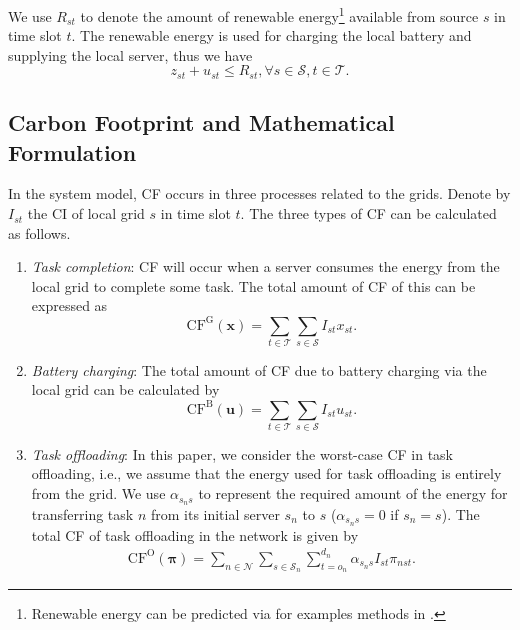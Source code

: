\documentclass[conference, 10pt, ﬁnal, letterpaper, twocolumn]{IEEEtran}
\begin{document}
We use $R_{st}$ to denote the amount of renewable energy\footnote{Renewable energy can be predicted via for examples methods in \cite{li2019renewable}.} available from source $s$ in time slot $t$. The renewable energy is used for charging the local battery and supplying the local server, thus we have  
\begin{equation}\label{c5}
    z_{st} + u_{st} \leq R_{st}, \forall s \in \mathcal{S}, t \in \mathcal{T}.
\end{equation}

\subsection{Carbon Footprint and Mathematical Formulation} \label{subsec:CFA}

In the system model, CF occurs in three processes related to the grids. Denote by $I_{st}$ the CI of local grid $s$ in time slot $t$. The three types of CF can be calculated as follows.
\begin{enumerate}
    \item {\em Task completion}: CF will occur when a server consumes the energy from the local grid to complete some task. The total amount of CF of this can be expressed as
    \begin{equation}\label{th}
        \text{CF}^{\text{G}}(\boldsymbol{x}) = \sum_{t \in \mathcal{T}} \sum_{s\in \mathcal{S}} I_{st}x_{st}.
    \end{equation}
    \item {\em Battery charging}: The total amount of CF due to battery charging via the local grid can be calculated by
    \begin{equation}\label{bc}
        \text{CF}^{\text{B}}(\boldsymbol{u}) = \sum_{t \in \mathcal{T}} \sum_{s\in \mathcal{S}} I_{st}u_{st}.
    \end{equation}
    \item {\em Task offloading}: In this paper, we consider the worst-case CF in task offloading, i.e., we assume that the energy used for task offloading is entirely from the grid. We use $\alpha_{s_n s}$ to represent the required amount of the energy for transferring task $n$ from its initial server $s_n$ to $s$ ($\alpha_{s_n s} = 0$ if $s_n = s$). The total CF of task offloading in the network is given by
    \begin{align}\label{tt}
        \text{CF}^{\text{O}}(\boldsymbol{\pi}) =  \sum_{n \in \mathcal{N}} \sum_{s \in \mathcal{S}_n}  \sum^{d_n}_{t = o_n} \alpha_{s_n s} I_{st}  \pi_{nst}.
    \end{align}
\end{enumerate}
\end{document}

